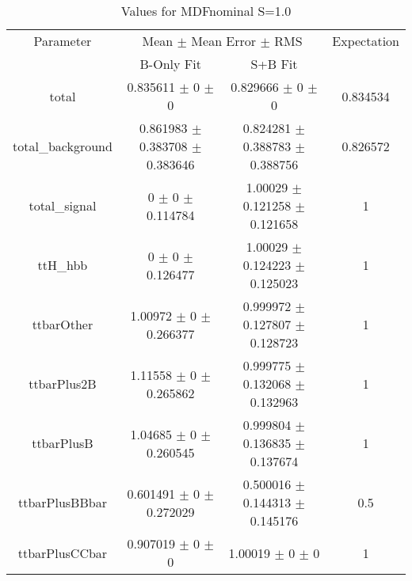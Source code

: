 \begin{table}
\centering
\caption{Values for MDFnominal S=1.0}
\begin{tabular}{cccc}
\toprule
Parameter & \multicolumn{2}{c}{Mean $\pm$ Mean Error $\pm$ RMS} & Expectation\\
 & B-Only Fit & S+B Fit & \\
\midrule
total & \num{0.835611} $\pm$ \num{0} $\pm$ \num{0} & \num{0.829666} $\pm$ \num{0} $\pm$ \num{0} & \num{0.834534}\\
total\_background & \num{0.861983} $\pm$ \num{0.383708} $\pm$ \num{0.383646} & \num{0.824281} $\pm$ \num{0.388783} $\pm$ \num{0.388756} & \num{0.826572}\\
total\_signal & \num{0} $\pm$ \num{0} $\pm$ \num{0.114784} & \num{1.00029} $\pm$ \num{0.121258} $\pm$ \num{0.121658} & \num{1}\\
ttH\_hbb & \num{0} $\pm$ \num{0} $\pm$ \num{0.126477} & \num{1.00029} $\pm$ \num{0.124223} $\pm$ \num{0.125023} & \num{1}\\
ttbarOther & \num{1.00972} $\pm$ \num{0} $\pm$ \num{0.266377} & \num{0.999972} $\pm$ \num{0.127807} $\pm$ \num{0.128723} & \num{1}\\
ttbarPlus2B & \num{1.11558} $\pm$ \num{0} $\pm$ \num{0.265862} & \num{0.999775} $\pm$ \num{0.132068} $\pm$ \num{0.132963} & \num{1}\\
ttbarPlusB & \num{1.04685} $\pm$ \num{0} $\pm$ \num{0.260545} & \num{0.999804} $\pm$ \num{0.136835} $\pm$ \num{0.137674} & \num{1}\\
ttbarPlusBBbar & \num{0.601491} $\pm$ \num{0} $\pm$ \num{0.272029} & \num{0.500016} $\pm$ \num{0.144313} $\pm$ \num{0.145176} & \num{0.5}\\
ttbarPlusCCbar & \num{0.907019} $\pm$ \num{0} $\pm$ \num{0} & \num{1.00019} $\pm$ \num{0} $\pm$ \num{0} & \num{1}\\
\bottomrule
\end{tabular}
\end{table}